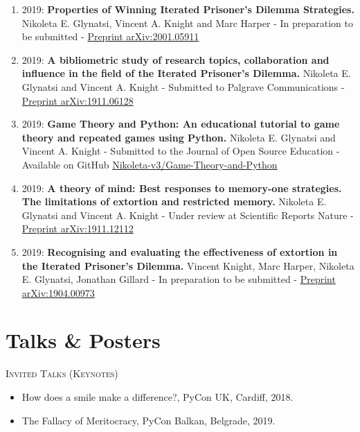 \begin{enumerate}
	\def\labelenumi{\arabic{enumi}.}
\item 2019: \textbf{Properties of Winning Iterated Prisoner's Dilemma Strategies.} Nikoleta E. Glynatsi, Vincent A. Knight and Marc Harper -
In preparation to be submitted - \href{https://arxiv.org/abs/2001.05911}{Preprint arXiv:2001.05911}
\item 2019: \textbf{A bibliometric study of research topics, collaboration and influence in the field of the Iterated Prisoner's Dilemma.}
Nikoleta E. Glynatsi and Vincent A. Knight -
Submitted to Palgrave Communications - \href{https://arxiv.org/abs/1911.12112}{Preprint arXiv:1911.06128}
\item 2019: \textbf{Game Theory and Python: An educational tutorial to game
theory and repeated games using Python.} Nikoleta E. Glynatsi and Vincent A. Knight -
Submitted to the Journal of Open Source Education - Available on GitHub
\href{https://github.com/Nikoleta-v3/Game-Theory-and-Python}{Nikoleta-v3/Game-Theory-and-Python}
\item 2019: \textbf{A theory of mind: Best responses to memory-one strategies.
The limitations of extortion and restricted memory.} Nikoleta E. Glynatsi and Vincent A. Knight -
Under review at Scientific Reports Nature -
\href{https://arxiv.org/abs/1911.12112}{Preprint arXiv:1911.12112}
\item 2019: \textbf{Recognising and evaluating the effectiveness of extortion in
the Iterated Prisoner's Dilemma.} Vincent Knight, Marc Harper, Nikoleta E. Glynatsi,
Jonathan Gillard -
In preparation to be submitted -
\href{https://arxiv.org/abs/1904.00973}{Preprint arXiv:1904.00973}
\end{enumerate}

\section*{Talks \& Posters}

\textsc{Invited Talks (Keynotes)}
\begin{itemize}
	\item How does a smile make a difference?, PyCon UK, Cardiff, 2018.
	\item The Fallacy of Meritocracy, PyCon Balkan, Belgrade, 2019.
\end{itemize}

